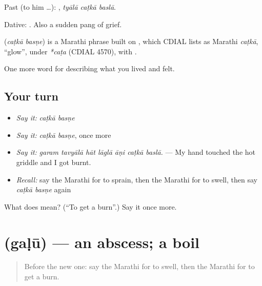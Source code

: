 Past (to him …):   , \emph{tyālā caṭkā baslā}.

Dative:   . Also a sudden pang of grief.

\begin{cousinweb}
\textbf{ } (\emph{caṭkā basṇe}) is a Marathi phrase built on , which CDIAL lists as Marathi \emph{caṭkā}, \textquotedblleft{}glow\textquotedblright{}, under \emph{*caṭa} (CDIAL 4570), with .
\end{cousinweb}

\begin{grammarlens}[title={What you've built}]
One more word for describing what you lived and felt.
\end{grammarlens}

\subsection*{Your turn}
\begin{itemize}
\raggedright
  \item \emph{Say it:} \emph{caṭkā basṇe}
  \item \emph{Say it:} \emph{caṭkā basṇe}, once more
  \item \emph{Say it:} \emph{garam tavyālā hāt lāglā āṇi caṭkā baslā.} — My hand touched the hot griddle and I got burnt.
  \item \emph{Recall:} say the Marathi for to sprain, then the Marathi for to swell, then say \emph{caṭkā basṇe} again
\end{itemize}

\begin{tcolorbox}[breakable,colback=teal!4,colframe=teal!35!black,title={Before you move on}]
What does   mean? (\textquotedblleft{}To get a burn\textquotedblright{}.) Say it once more.
\end{tcolorbox}
\section[\texorpdfstring{\mr{गळू} (gaḷū)}{गळू (gaḷū)}]{ (gaḷū) — an abscess; a boil}

\label{lesson:MR-C487-galu}



\begin{quote}
Before the new one: say the Marathi for to swell, then the Marathi for to get a burn.
\end{quote}

